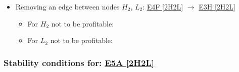 \begin{itemize}
\begin{itemize}
	\end{itemize}

	\item Removing an edge between nodes $H_2$, $L_2$: \hyperref[apx:E4F:2H2L]{E4F [2H2L]} $\to$ \hyperref[apx:E3H:2H2L]{E3H [2H2L]}

	\begin{itemize}

		\item For $H_2$ not to be profitable:


		\item For $L_2$ not to be profitable:


	\end{itemize}

\end{itemize}



\subsubsection{Stability conditions for: \hyperref[apx:E5A:2H2L]{E5A [2H2L]}}
\label{apx:E5A:2H2L_stability_cond}

